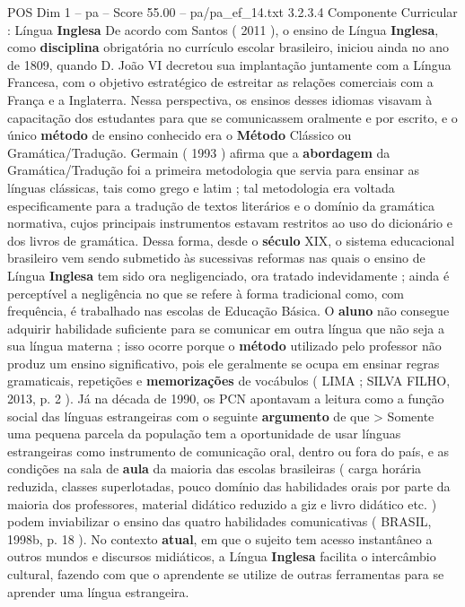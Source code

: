 \begin{textsample}{POS Dim 1 – pa – Score 55.00 – pa/pa\_ef\_14.txt}  \label{ex:f1_pos_039}
3.2.3.4 Componente Curricular : Língua \textbf{Inglesa} De acordo com Santos ( 2011 ), o ensino de Língua \textbf{Inglesa}, como \textbf{disciplina} obrigatória no currículo escolar brasileiro, iniciou ainda no ano de 1809, quando D.
João VI decretou sua implantação juntamente com a Língua Francesa, com o objetivo estratégico de estreitar as relações comerciais com a França e a Inglaterra.
Nessa perspectiva, os ensinos desses idiomas visavam à capacitação dos estudantes para que se comunicassem oralmente e por escrito, e o único \textbf{método} de ensino conhecido era o \textbf{Método} Clássico ou Gramática/Tradução.
Germain ( 1993 ) afirma que a \textbf{abordagem} da Gramática/Tradução foi a primeira metodologia que servia para ensinar as línguas clássicas, tais como grego e latim ; tal metodologia era voltada especificamente para a tradução de textos literários e o domínio da gramática normativa, cujos principais instrumentos estavam restritos ao uso do dicionário e dos livros de gramática.
Dessa forma, desde o \textbf{século} XIX, o sistema educacional brasileiro vem sendo submetido às sucessivas reformas nas quais o ensino de Língua \textbf{Inglesa} tem sido ora negligenciado, ora tratado indevidamente ; ainda é perceptível a negligência no que se refere à forma tradicional como, com frequência, é trabalhado nas escolas de Educação Básica.
O \textbf{aluno} não consegue adquirir habilidade suficiente para se comunicar em outra língua que não seja a sua língua materna ; isso ocorre porque o \textbf{método} utilizado pelo professor não produz um ensino significativo, pois ele geralmente se ocupa em ensinar regras gramaticais, repetições e \textbf{memorizações} de vocábulos ( LIMA ; SILVA FILHO, 2013, p. 2 ).
Já na década de 1990, os PCN apontavam a leitura como a função social das línguas estrangeiras com o seguinte \textbf{argumento} de que > Somente uma pequena parcela da população tem a oportunidade de usar línguas estrangeiras como instrumento de comunicação oral, dentro ou fora do país, e as condições na sala de \textbf{aula} da maioria das escolas brasileiras ( carga horária reduzida, classes superlotadas, pouco domínio das habilidades orais por parte da maioria dos professores, material didático reduzido a giz e livro didático etc. ) podem inviabilizar o ensino das quatro habilidades comunicativas ( BRASIL, 1998b, p. 18 ).
No contexto \textbf{atual}, em que o sujeito tem acesso instantâneo a outros mundos e discursos midiáticos, a Língua \textbf{Inglesa} facilita o intercâmbio cultural, fazendo com que o aprendente se utilize de outras ferramentas para se aprender uma língua estrangeira.

\end{textsample}
